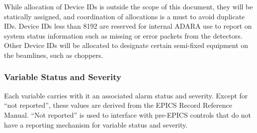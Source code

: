 While allocation of Device IDs is outside the scope of this document, they
will be statically assigned, and coordination of allocations is a must
to avoid duplicate IDs. Device IDs less than 8192 are reserved for
internal ADARA use to report on system status information such as missing
or error packets from the detectors. Other Device IDs will be allocated
to designate certain semi-fixed equipment on the beamlines, such as
choppers.


\newpage
\subsubsection{Variable Status and Severity}

Each variable carries with it an associated alarm status and severity.  Except
for ``not reported'', these values are derived from the EPICS Record Reference
Manual. ``Not reported'' is used to interface with pre-EPICS controls that
do not have a reporting mechanism for variable status and severity.

